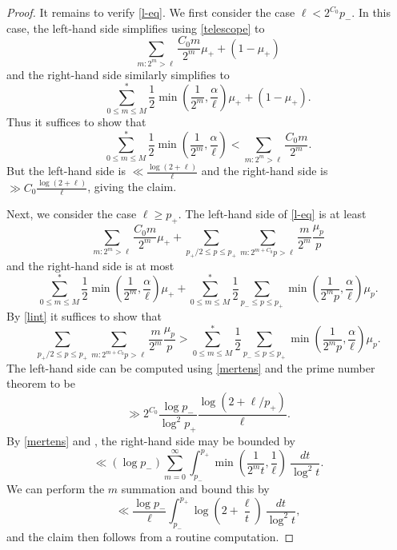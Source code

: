 \documentclass[12pt,a4paper,reqno]{amsart}
\numberwithin{equation}{section}
\theoremstyle{plain}
\theoremstyle{definition}
\begin{document}
\begin{proof}
It remains to verify \eqref{l-eq}.  We first consider the case $\ell < 2^{C_0} p_-$.  In this case, the left-hand side simplifies using \eqref{telescope} to
$$ \sum_{m: 2^m > \ell} \frac{C_0 m}{2^m} \mu_+ + (1-\mu_+)$$
and the right-hand side similarly simplifies to
$$ \sum_{0 \leq m \leq M}^* \frac{1}{2} \min\left( \frac{1}{2^m}, \frac{\alpha}{\ell}\right) \mu_+ + (1-\mu_+).$$
Thus it suffices to show that
\begin{equation}\label{lint} \sum_{0 \leq m \leq M}^* \frac{1}{2} \min( \frac{1}{2^m}, \frac{\alpha}{\ell}) < \sum_{m: 2^m > \ell} \frac{C_0 m}{2^m}.
\end{equation}
But the left-hand side is $\ll \frac{\log (2+\ell)}{\ell}$ and the right-hand side is $\gg C_0 \frac{\log (2+\ell)}{\ell}$, giving the claim.

Next, we consider the case $\ell \geq p_+$.  The left-hand side of \eqref{l-eq} is at least 
$$ \sum_{m: 2^m > \ell} \frac{C_0 m}{2^m} \mu_+ 
+ \sum_{p_+/2 \leq p \leq p_+} \sum_{m: 2^{m+C_0} p > \ell} \frac{m}{2^m} \frac{\mu_p}{p}$$
and the right-hand side is at most
\begin{equation}\label{amp} 
  \sum_{0 \leq m \leq M}^* \frac{1}{2} \min(\frac{1}{2^m}, \frac{\alpha}{\ell})\mu_+ + \sum_{0 \leq m \leq M}^* \frac{1}{2} \sum_{p_- \leq p \leq p_+} \min\left(\frac{1}{2^mp}, \frac{\alpha}{\ell}\right) \mu_p.
\end{equation}
By \eqref{lint} it suffices to show that
$$
\sum_{p_+/2 \leq p \leq p_+} \sum_{m: 2^{m+C_0} p > \ell} \frac{m}{2^m} \frac{\mu_p}{p}
> \sum_{0 \leq m \leq M}^* \frac{1}{2} \sum_{p_- \leq p \leq p_+} \min\left(\frac{1}{2^mp}, \frac{\alpha}{\ell}\right) \mu_p.$$
The left-hand side can be computed using \eqref{mertens} and the prime number theorem to be
$$ \gg 2^{C_0} \frac{\log p_-}{\log^2 p_+} \frac{\log (2+\ell/p_+)}{\ell}.$$
By \eqref{mertens} and , the right-hand side may be bounded by
$$ \ll (\log p_-) \sum_{m=0}^\infty \int_{p_-}^{p_+} \min\left(\frac{1}{2^m t}, \frac{1}{\ell}\right)\ \frac{dt}{\log^2 t}.$$
We can perform the $m$ summation and bound this by
$$ \ll \frac{\log p_-}{\ell} \int_{p_-}^{p_+} \log\left(2 + \frac{\ell}{t}\right)\ \frac{dt}{\log^2 t},$$
and the claim then follows from a routine computation.


\end{proof}
\end{document}

